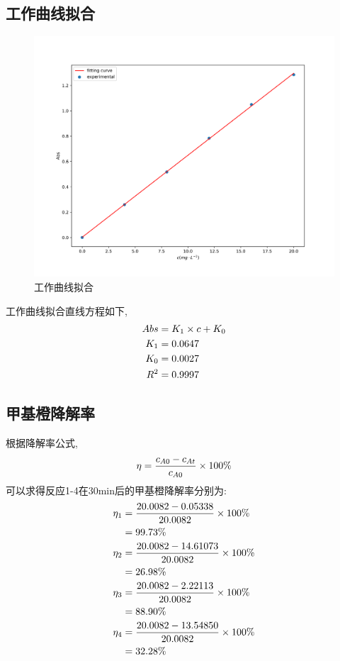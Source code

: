 \documentclass[a4paper]{article}
\begin{document}
\subsection{工作曲线拟合}
\begin{figure}[H]
	\centering
	\includegraphics[width = 0.5\paperwidth]{fig/working.png}
	\caption{工作曲线拟合}
\end{figure}
工作曲线拟合直线方程如下, 
\begin{equation}
	\centering
	\begin{aligned}
		Abs &= K_{1} \times c + K_{0}\\
		K_{1} &= 0.0647\\
		K_{0} &= 0.0027\\
		R^{2} &= 0.9997\\
	\end{aligned}
\end{equation}
\subsection{甲基橙降解率}
根据降解率公式, 
\begin{equation}
	\eta = \frac{c_{A0}-c_{At}}{c_{A0}}\times 100\%\\
\end{equation}
可以求得反应1-4在30min后的甲基橙降解率分别为:
\begin{equation}
	\centering
	\begin{aligned}
		\eta_{1} &= \frac{20.0082-0.05338}{20.0082}\times 100\%\\
		&=99.73\%\\ 	
		\eta_{2} &= \frac{20.0082-14.61073}{20.0082}\times 100\%\\ 
		&=26.98\%\\
		\eta_{3} &= \frac{20.0082-2.22113}{20.0082}\times 100\%\\
		&=88.90\%\\ 
		\eta_{4} &= \frac{20.0082-13.54850}{20.0082}\times 100\%\\ 
		&=32.28\%\\
	\end{aligned}
\end{equation}
\end{document}
